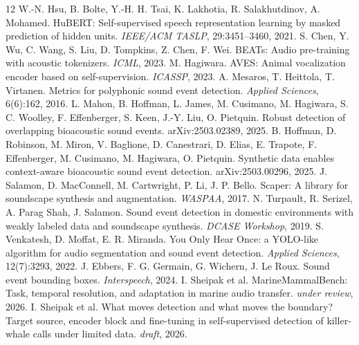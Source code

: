 \documentclass[10pt,twocolumn]{article}
\begin{document}

\begin{thebibliography}{12}
 W.-N. Hsu, B. Bolte, Y.-H. H. Tsai, K. Lakhotia, R. Salakhutdinov, A. Mohamed. HuBERT: Self-supervised speech representation learning by masked prediction of hidden units. \emph{IEEE/ACM TASLP}, 29:3451--3460, 2021.
 S. Chen, Y. Wu, C. Wang, S. Liu, D. Tompkins, Z. Chen, F. Wei. BEATs: Audio pre-training with acoustic tokenizers. \emph{ICML}, 2023.
 M. Hagiwara. AVES: Animal vocalization encoder based on self-supervision. \emph{ICASSP}, 2023.
 A. Mesaros, T. Heittola, T. Virtanen. Metrics for polyphonic sound event detection. \emph{Applied Sciences}, 6(6):162, 2016.
 L. Mahon, B. Hoffman, L. James, M. Cusimano, M. Hagiwara, S. C. Woolley, F. Effenberger, S. Keen, J.-Y. Liu, O. Pietquin. Robust detection of overlapping bioacoustic sound events. arXiv:2503.02389, 2025.
 B. Hoffman, D. Robinson, M. Miron, V. Baglione, D. Canestrari, D. Elias, E. Trapote, F. Effenberger, M. Cusimano, M. Hagiwara, O. Pietquin. Synthetic data enables context-aware bioacoustic sound event detection. arXiv:2503.00296, 2025.
 J. Salamon, D. MacConnell, M. Cartwright, P. Li, J. P. Bello. Scaper: A library for soundscape synthesis and augmentation. \emph{WASPAA}, 2017.
 N. Turpault, R. Serizel, A. Parag Shah, J. Salamon. Sound event detection in domestic environments with weakly labeled data and soundscape synthesis. \emph{DCASE Workshop}, 2019.
 S. Venkatesh, D. Moffat, E. R. Miranda. You Only Hear Once: a YOLO-like algorithm for audio segmentation and sound event detection. \emph{Applied Sciences}, 12(7):3293, 2022.
 J. Ebbers, F. G. Germain, G. Wichern, J. Le Roux. Sound event bounding boxes. \emph{Interspeech}, 2024.
 I. Sheipak et al. MarineMammalBench: Task, temporal resolution, and adaptation in marine audio transfer. \emph{under review}, 2026.
 I. Sheipak et al. What moves detection and what moves the boundary? Target source, encoder block and fine-tuning in self-supervised detection of killer-whale calls under limited data. \emph{draft}, 2026.
\end{thebibliography}
\end{document}
